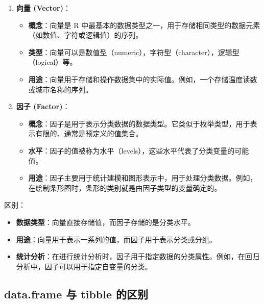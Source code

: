 \documentclass[
]{article}
\begin{document}
\begin{enumerate}
\def\labelenumi{\arabic{enumi}.}
\item
  \textbf{向量 (Vector)}：

  \begin{itemize}
  \item
    \textbf{概念}：向量是 R
    中最基本的数据类型之一，用于存储相同类型的数据元素（如数值、字符或逻辑值）的序列。
  \item
    \textbf{类型}：向量可以是数值型（numeric），字符型（character），逻辑型（logical）等。
  \item
    \textbf{用途}：向量用于存储和操作数据集中的实际值。例如，一个存储温度读数或城市名称的序列。
  \end{itemize}
\item
  \textbf{因子 (Factor)}：

  \begin{itemize}
  \item
    \textbf{概念}：因子是用于表示分类数据的数据类型。它类似于枚举类型，用于表示有限的、通常是预定义的值集合。
  \item
    \textbf{水平}：因子的值被称为水平（levels），这些水平代表了分类变量的可能值。
  \item
    \textbf{用途}：因子主要用于统计建模和图形表示中，用于处理分类数据。例如，在绘制条形图时，条形的类别就是由因子类型的变量确定的。
  \end{itemize}
\end{enumerate}

区别：

\begin{itemize}
\item
  \textbf{数据类型}：向量直接存储值，而因子存储的是分类水平。
\item
  \textbf{用途}：向量用于表示一系列的值，而因子用于表示分类或分组。
\item
  \textbf{统计分析}：在进行统计分析时，因子用于指定数据的分类属性。例如，在回归分析中，因子可以用于指定自变量的分类。
\end{itemize}

\hypertarget{dataframe-ux4e0e-tibble-ux7684ux533aux522b}{%
\subsection{data.frame 与 tibble
的区别}\label{dataframe-ux4e0e-tibble-ux7684ux533aux522b}}
\end{document}
